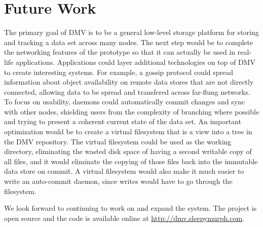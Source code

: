 \section{Future Work}

The primary goal of DMV is to be a general low-level storage platform for
storing and tracking a data set across many nodes. The next step would be to
complete the networking features of the prototype so that it can actually be
used in real-life applications. Applications could layer additional technologies
on top of DMV to create interesting systems. For example, a gossip protocol
could spread information about object availability on remote data stores that
are not directly connected, allowing data to be spread and transfered across
far-flung networks. To focus on usability, daemons could automatically
\gls{commit} changes and sync with other nodes, shielding users from the
complexity of branching where possible and trying to present a coherent current
state of the data set. An important optimization would be to create a virtual
filesystem that is a view into a \gls{tree} in the DMV repository. The virtual
filesystem could be used as the working directory, eliminating the wasted disk
space of having a second writable copy of all files, and it would eliminate the
copying of those files back into the immutable data store on \gls{commit}. A
virtual filesystem would also make it much easier to write an auto-\gls{commit}
daemon, since writes would have to go through the filesystem.

We look forward to continuing to work on and expand the system. The project is
open source and the code is available online at
\url{http://dmv.sleepymurph.com}.
